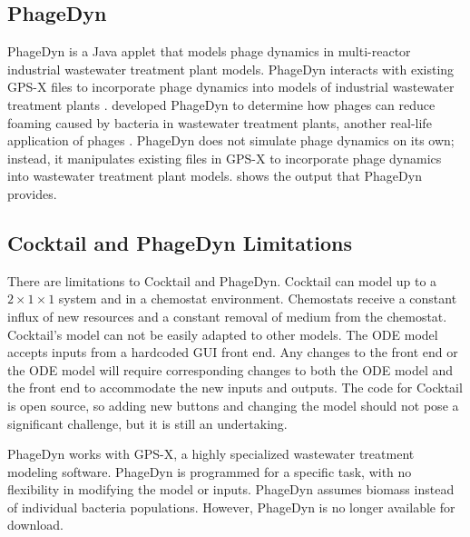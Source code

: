 \subsection{PhageDyn}
PhageDyn is a Java applet that models phage dynamics in multi-reactor industrial wastewater treatment plant models. 
PhageDyn interacts with existing GPS-X \cite{AdvancedWastewaterModelling} files to incorporate phage dynamics into models of industrial wastewater treatment plants \cite{krysiak-baltynSimulationPhageDynamics2017}. 
\citet{krysiak-baltynSimulationPhageDynamics2017} developed PhageDyn to determine how phages can reduce foaming caused by bacteria in wastewater treatment plants, another real-life application of phages \cite{heardEffectFilamentousBacteria2008}. 
PhageDyn does not simulate phage dynamics on its own; instead, it manipulates existing files in GPS-X to incorporate phage dynamics into wastewater treatment plant models. 
 shows the output that PhageDyn provides. 

\subsection{Cocktail and PhageDyn Limitations}
\label{sec:literature:cocktail_and_phagedyn_limitations}
There are limitations to Cocktail and PhageDyn. 
Cocktail can model up to a $2\times 1 \times 1$ system and in a chemostat environment. 
Chemostats receive a constant influx of new resources and a constant removal of medium from the chemostat. 
Cocktail's model can not be easily adapted to other models. 
The ODE model accepts inputs from a hardcoded GUI front end. 
Any changes to the front end or the ODE model will require corresponding changes to both the ODE model and the front end to accommodate the new inputs and outputs. 
The code for Cocktail is open source, so adding new buttons and changing the model should not pose a significant challenge, but it is still an undertaking. 

PhageDyn works with GPS-X, a highly specialized wastewater treatment modeling software. 
PhageDyn is programmed for a specific task, with no flexibility in modifying the model or inputs. 
PhageDyn assumes biomass instead of individual bacteria populations. 
However, PhageDyn is no longer available for download.

